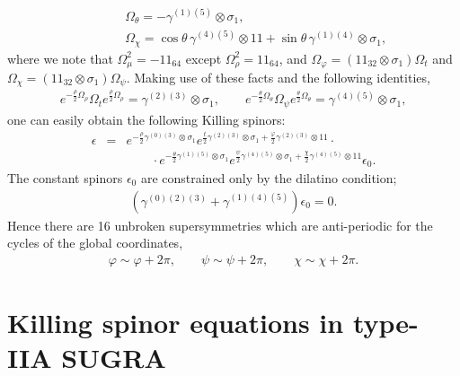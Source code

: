 \documentclass[a4paper,12pt]{article}
\begin{document}
\begin{appendix}
\begin{eqnarray}
&&\qquad \Omega_\theta=  -\gamma^{(1)(5)}\otimes\sigma_1,\nonumber\\
&&\qquad \Omega_\chi= \cos{\theta}\,\gamma^{(4)(5)}\otimes 1\!\!1 + \sin{\theta}\,\gamma^{(1)(4)}\otimes\sigma_1,
\end{eqnarray}
where we note that $\Omega_\mu^2=-1\!\!1_{64}$ except $\Omega_\rho^2=1\!\!1_{64}$, and $\Omega_\varphi=\left(1\!\!1_{32}\otimes\sigma_1\right)\Omega_t$ and $\Omega_\chi=\left(1\!\!1_{32}\otimes\sigma_1\right)\Omega_\psi$. Making use of these facts and the following identities,
\begin{eqnarray}
e^{-\frac{\rho}{2}\Omega_\rho}\Omega_t e^{\frac{\rho}{2}\Omega_\rho}=\gamma^{(2)(3)}\otimes\sigma_1,\qquad e^{-\frac{\theta}{2}\Omega_\theta}\Omega_\psi e^{\frac{\theta}{2}\Omega_\theta}=\gamma^{(4)(5)}\otimes\sigma_1,
\end{eqnarray}
one can easily obtain the following Killing spinors:
\begin{eqnarray}\label{adsKilling}
\epsilon&=&e^{-\frac{\rho}{2}\gamma^{(0)(3)}\otimes\sigma_1}e^{\frac{t}{2}\gamma^{(2)(3)}\otimes\sigma_1+\frac{\varphi}{2}\gamma^{(2)(3)}\otimes1\!\!1}\cdot\nonumber\\
&&\qquad \cdot e^{-\frac{\theta}{2}\gamma^{(1)(5)}\otimes\sigma_1}e^{\frac{\psi}{2}\gamma^{(4)(5)}\otimes\sigma_1+\frac{\chi}{2}\gamma^{(4)(5)}\otimes1\!\!1}\epsilon_0.
\end{eqnarray}
The constant spinors $\epsilon_0$ are constrained only by the dilatino condition;
\begin{eqnarray}
\left(\gamma^{(0)(2)(3)}+\gamma^{(1)(4)(5)}\right)\epsilon_0=0.
\end{eqnarray}
Hence there are 16 unbroken supersymmetries which are anti-periodic for the cycles of the global coordinates,
\begin{eqnarray}
\varphi \sim \varphi+2\pi,\qquad \psi \sim \psi+2\pi,\qquad \chi \sim \chi+2\pi.\end{eqnarray}

\section{Killing spinor equations in type-IIA SUGRA}\label{iia}


\end{appendix}
\end{document}
